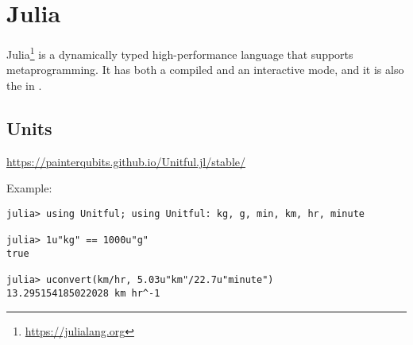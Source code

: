\section{Julia}
\label{lang:julia}

Julia\footnote{\url{https://julialang.org}} is a dynamically typed high-performance language that supports metaprogramming. It has both a compiled and an interactive mode, and it is also the  in .

\subsection{Units}

\url{https://painterqubits.github.io/Unitful.jl/stable/}

Example:
\begin{verbatim}
julia> using Unitful; using Unitful: kg, g, min, km, hr, minute

julia> 1u"kg" == 1000u"g"
true

julia> uconvert(km/hr, 5.03u"km"/22.7u"minute")
13.295154185022028 km hr^-1
\end{verbatim}

